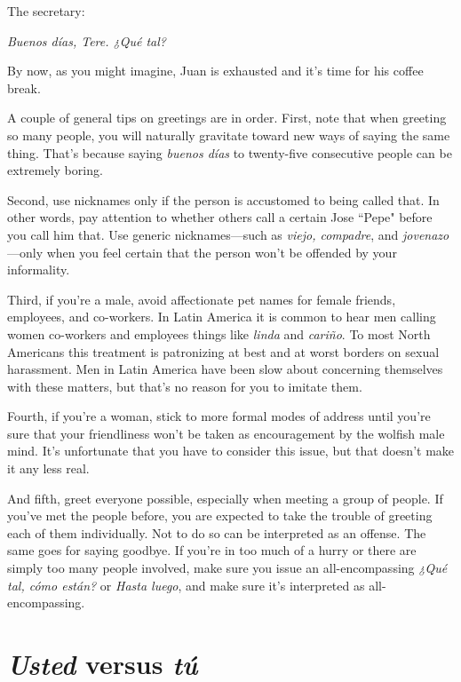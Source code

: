 \inda The secretary:

\indu \emph{Buenos días, Tere. ¿Qué tal?}

\bsk

By now, as you might imagine, Juan is exhausted and it's time for his
coffee break.

A couple of general tips on greetings are in order. First, note
that when greeting so many people, you will naturally gravitate toward
new ways of saying the same thing. That's because saying \emph{buenos días}
to twenty-five consecutive people can be extremely boring.

Second, use nicknames only if the person is accustomed to being called that. In other words, pay attention to whether others call a
certain Jose ``Pepe" before you call him that. Use generic nicknames---such as \emph{viejo, compadre}, and \emph{jovenazo}---only when you feel certain
that the person won't be offended by your informality.

Third, if you're a male, avoid affectionate pet names for female
friends, employees, and co-workers. In Latin America it is common to
hear men calling women co-workers and employees things like \emph{linda}
and \emph{cariño}. To most North Americans this treatment is patronizing at
best and at worst borders on sexual harassment. Men in Latin America
have been slow about concerning themselves with these matters, but
that's no reason for you to imitate them.

Fourth, if you're a woman, stick to more formal modes of address until you're sure that your friendliness won't be taken as encouragement by the wolfish male mind. It's unfortunate that you have to
consider this issue, but that doesn't make it any less real.

And fifth, greet everyone possible, especially when meeting
a group of people. If you've met the people before, you are expected
to take the trouble of greeting each of them individually. Not to do
so can be interpreted as an offense. The same goes for saying goodbye. If you're in too much of a hurry or there are simply too many
people involved, make sure you issue an all-encompassing \emph{¿Qué tal,
cómo están?} or \emph{Hasta luego}, and make sure it's interpreted as all-encompassing.

\section{\emph{Usted} versus \emph{tú}}

